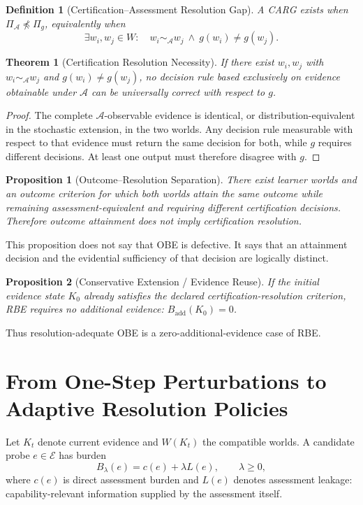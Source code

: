 \documentclass[11pt]{article}
\newtheorem{theorem}{Theorem}
\newtheorem{proposition}{Proposition}
\newtheorem{definition}{Definition}
\newcommand{\cA}{\mathcal A}\newcommand{\cE}{\mathcal E}\newcommand{\cW}{\mathcal W}
\begin{document}
\begin{definition}[Certification--Assessment Resolution Gap]
A CARG exists when $\Pi_{\cA}\not\preceq\Pi_g$, equivalently when
\[
\exists w_i,w_j\in W:\quad w_i\sim_{\cA}w_j\ \land\ g(w_i)\neq g(w_j).
\]
\end{definition}

\begin{theorem}[Certification Resolution Necessity]\label{thm:necessity}
If there exist $w_i,w_j$ with $w_i\sim_{\cA}w_j$ and $g(w_i)\neq g(w_j)$, no decision rule based exclusively on evidence obtainable under $\cA$ can be universally correct with respect to $g$.
\end{theorem}
\begin{proof}
The complete $\cA$-observable evidence is identical, or distribution-equivalent in the stochastic extension, in the two worlds. Any decision rule measurable with respect to that evidence must return the same decision for both, while $g$ requires different decisions. At least one output must therefore disagree with $g$.
\end{proof}

\begin{proposition}[Outcome--Resolution Separation]
There exist learner worlds and an outcome criterion for which both worlds attain the same outcome while remaining assessment-equivalent and requiring different certification decisions. Therefore outcome attainment does not imply certification resolution.
\end{proposition}
This proposition does not say that OBE is defective. It says that an attainment decision and the evidential sufficiency of that decision are logically distinct.

\begin{proposition}[Conservative Extension / Evidence Reuse]\label{prop:conservative}
If the initial evidence state $K_0$ already satisfies the declared certification-resolution criterion, RBE requires no additional evidence: $B_{\mathrm{add}}(K_0)=0$.
\end{proposition}
Thus resolution-adequate OBE is a zero-additional-evidence case of RBE.

\section{From One-Step Perturbations to Adaptive Resolution Policies}
Let $K_t$ denote current evidence and $W(K_t)$ the compatible worlds. A candidate probe $e\in\cE$ has burden
\[
B_\lambda(e)=c(e)+\lambda L(e),\qquad \lambda\ge0,
\]
where $c(e)$ is direct assessment burden and $L(e)$ denotes assessment leakage: capability-relevant information supplied by the assessment itself.
\end{document}
